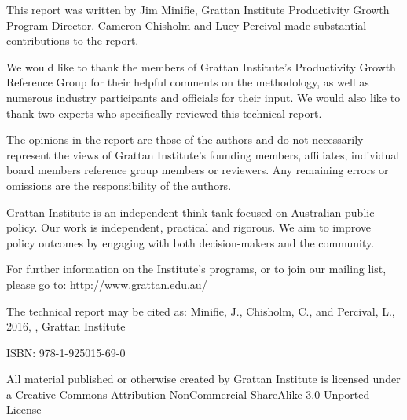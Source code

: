 This report was written by Jim Minifie, Grattan Institute Productivity Growth Program Director. Cameron Chisholm and Lucy Percival made substantial contributions to the report.

We would like to thank the members of Grattan Institute's Productivity Growth Reference Group for their helpful comments on the methodology, as well as numerous industry participants and officials for their input. We would also like to thank two experts who specifically reviewed this technical report.

The opinions in the report are those of the authors and do not necessarily represent the views of Grattan Institute’s founding members, affiliates, individual board members reference group members or reviewers. Any remaining errors or omissions are the responsibility of the authors.

Grattan Institute is an independent think-tank focused on Australian public policy. Our work is independent, practical and rigorous. We aim to improve policy outcomes by engaging with both decision-makers and the community.

For further information on the Institute's programs, or to join our mailing list, please go to:
\url{http://www.grattan.edu.au/}

{\footnotesize
The technical report may be cited as:
\newline
Minifie, J., Chisholm, C., and Percival, L., 2016, \textit{\fulltitle}, Grattan Institute

ISBN: 978-1-925015-69-0

All material published or otherwise created by Grattan Institute is licensed under a Creative Commons Attribution-NonCommercial-ShareAlike 3.0 Unported License 
}